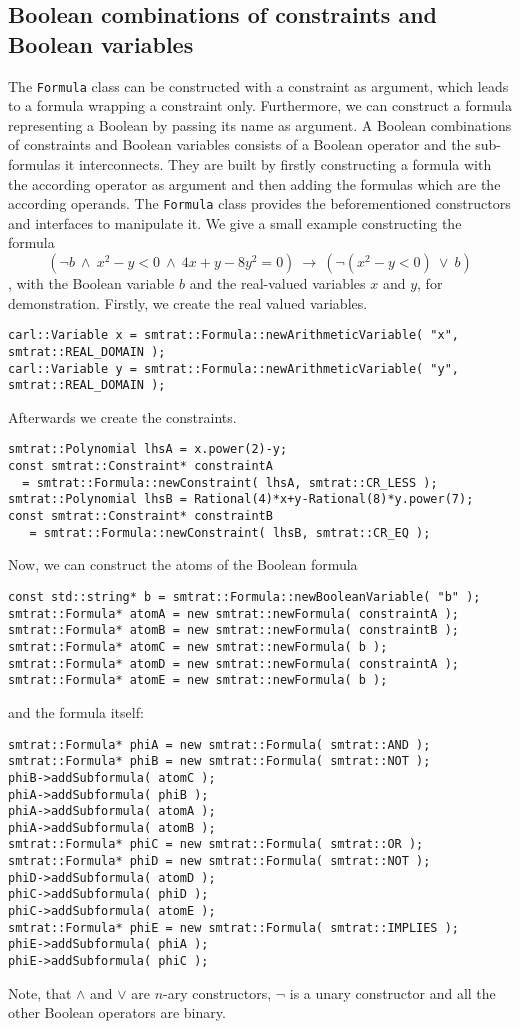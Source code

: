 \subsection{Boolean combinations of constraints and Boolean variables}
The \texttt{Formula} class can be constructed with a constraint as argument, which leads to a formula wrapping a constraint only. Furthermore, we can construct a formula representing a Boolean by passing its name as argument. A Boolean combinations of constraints and Boolean variables consists of a Boolean operator and the sub-formulas it interconnects. They are built by firstly constructing a formula with the according operator as argument and then adding the formulas which are the according operands. The \texttt{Formula} class provides the beforementioned constructors and interfaces to manipulate it. We give a small example constructing the formula \[(\neg b\ \land\ x^2-y<0\ \land\ 4x+y-8y^2=0 )\ \rightarrow\ (\neg(x^2-y<0)\ \lor\ b )\]
, with the Boolean variable $b$ and the real-valued variables $x$ and $y$, for demonstration. Firstly, we create the real valued variables.
\scriptsize
\begin{verbatim}
carl::Variable x = smtrat::Formula::newArithmeticVariable( "x", smtrat::REAL_DOMAIN );
carl::Variable y = smtrat::Formula::newArithmeticVariable( "y", smtrat::REAL_DOMAIN );
\end{verbatim}
\normalsize
Afterwards we create the constraints.
\scriptsize
\begin{verbatim}
smtrat::Polynomial lhsA = x.power(2)-y;
const smtrat::Constraint* constraintA 
  = smtrat::Formula::newConstraint( lhsA, smtrat::CR_LESS );
smtrat::Polynomial lhsB = Rational(4)*x+y-Rational(8)*y.power(7);
const smtrat::Constraint* constraintB
   = smtrat::Formula::newConstraint( lhsB, smtrat::CR_EQ );
\end{verbatim}
\normalsize
Now, we can construct the atoms of the Boolean formula
\scriptsize
\begin{verbatim}
const std::string* b = smtrat::Formula::newBooleanVariable( "b" );
smtrat::Formula* atomA = new smtrat::newFormula( constraintA );
smtrat::Formula* atomB = new smtrat::newFormula( constraintB );
smtrat::Formula* atomC = new smtrat::newFormula( b );
smtrat::Formula* atomD = new smtrat::newFormula( constraintA );
smtrat::Formula* atomE = new smtrat::newFormula( b );
\end{verbatim}
\normalsize
and the formula itself:
\scriptsize
\begin{verbatim}
smtrat::Formula* phiA = new smtrat::Formula( smtrat::AND );
smtrat::Formula* phiB = new smtrat::Formula( smtrat::NOT );
phiB->addSubformula( atomC );
phiA->addSubformula( phiB );
phiA->addSubformula( atomA );
phiA->addSubformula( atomB );
smtrat::Formula* phiC = new smtrat::Formula( smtrat::OR );
smtrat::Formula* phiD = new smtrat::Formula( smtrat::NOT );
phiD->addSubformula( atomD );
phiC->addSubformula( phiD );
phiC->addSubformula( atomE );
smtrat::Formula* phiE = new smtrat::Formula( smtrat::IMPLIES );
phiE->addSubformula( phiA );
phiE->addSubformula( phiC );
\end{verbatim}
\normalsize
Note, that $\land$ and $\lor$ are $n$-ary constructors, $\neg$ is a unary constructor and all the other Boolean operators are binary.


